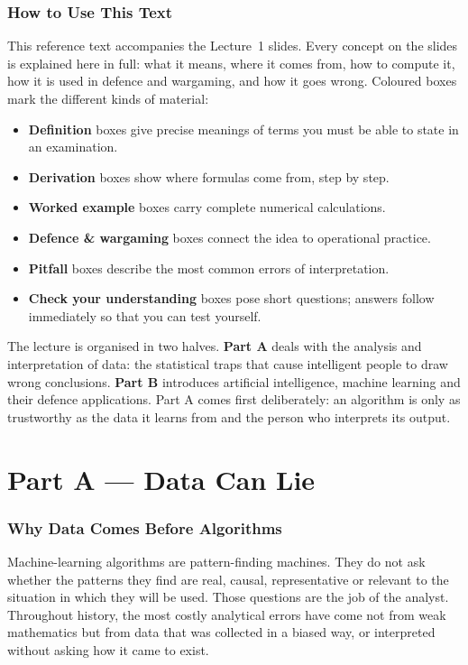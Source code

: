 \documentclass[11pt]{article}
\begin{document}
\tableofcontents
\newpage

\section{How to Use This Text}
This reference text accompanies the Lecture~1 slides. Every concept on the slides is explained here in full: what it means, where it comes from, how to compute it, how it is used in defence and wargaming, and how it goes wrong. Coloured boxes mark the different kinds of material:
\begin{itemize}
\item \textbf{Definition} boxes give precise meanings of terms you must be able to state in an examination.
\item \textbf{Derivation} boxes show where formulas come from, step by step.
\item \textbf{Worked example} boxes carry complete numerical calculations.
\item \textbf{Defence \& wargaming} boxes connect the idea to operational practice.
\item \textbf{Pitfall} boxes describe the most common errors of interpretation.
\item \textbf{Check your understanding} boxes pose short questions; answers follow immediately so that you can test yourself.
\end{itemize}
The lecture is organised in two halves. \textbf{Part A} deals with the analysis and interpretation of data: the statistical traps that cause intelligent people to draw wrong conclusions. \textbf{Part B} introduces artificial intelligence, machine learning and their defence applications. Part A comes first deliberately: an algorithm is only as trustworthy as the data it learns from and the person who interprets its output.

\part*{Part A --- Data Can Lie}

\section{Why Data Comes Before Algorithms}
Machine-learning algorithms are pattern-finding machines. They do not ask whether the patterns they find are real, causal, representative or relevant to the situation in which they will be used. Those questions are the job of the analyst. Throughout history, the most costly analytical errors have come not from weak mathematics but from data that was collected in a biased way, or interpreted without asking how it came to exist.
\end{document}
